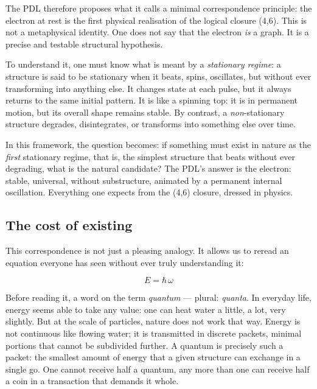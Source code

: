 \documentclass[11pt, a4paper, openright]{book}
\begin{document}
\medskip

The PDL therefore proposes what it calls a minimal correspondence principle: the electron at rest is the first physical realisation of the logical closure (4,6). This is not a metaphysical identity. One does not say that the electron \emph{is} a graph. It is a precise and testable structural hypothesis.

\medskip

To understand it, one must know what is meant by a \emph{stationary regime}: a structure is said to be stationary when it beats, spins, oscillates, but without ever transforming into anything else. It changes state at each pulse, but it always returns to the same initial pattern. It is like a spinning top: it is in permanent motion, but its overall shape remains stable. By contrast, a \emph{non}-stationary structure degrades, disintegrates, or transforms into something else over time.

\medskip

In this framework, the question becomes: if something must exist in nature as the \emph{first} stationary regime, that is, the simplest structure that beats without ever degrading, what is the natural candidate? The PDL’s answer is the electron: stable, universal, without substructure, animated by a permanent internal oscillation. Everything one expects from the (4,6) closure, dressed in physics.

\subsection*{The cost of existing}

This correspondence is not just a pleasing analogy. It allows us to reread an equation everyone has seen without ever truly understanding it:

\begin{equation}
E = \hbar\,\omega
\end{equation}

Before reading it, a word on the term \emph{quantum} — plural: \emph{quanta}. In everyday life, energy seems able to take any value: one can heat water a little, a lot, very slightly. But at the scale of particles, nature does not work that way. Energy is not continuous like flowing water; it is transmitted in discrete packets, minimal portions that cannot be subdivided further. A quantum is precisely such a packet: the smallest amount of energy that a given structure can exchange in a single go. One cannot receive half a quantum, any more than one can receive half a coin in a transaction that demands it whole.
\end{document}
